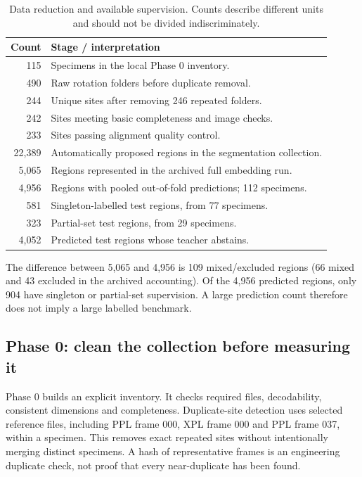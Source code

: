 \begin{table}[htbp]\centering
\caption{Data reduction and available supervision. Counts describe different units and should not be divided indiscriminately.}
\begin{tabularx}{\linewidth}{@{}rX@{}}\toprule Count & Stage / interpretation\\\midrule
115 & Specimens in the local Phase 0 inventory.\\
490 & Raw rotation folders before duplicate removal.\\
244 & Unique sites after removing 246 repeated folders.\\
242 & Sites meeting basic completeness and image checks.\\
233 & Sites passing alignment quality control.\\
22,389 & Automatically proposed regions in the segmentation collection.\\
5,065 & Regions represented in the archived full embedding run.\\
4,956 & Regions with pooled out-of-fold predictions; 112 specimens.\\
581 & Singleton-labelled test regions, from 77 specimens.\\
323 & Partial-set test regions, from 29 specimens.\\
4,052 & Predicted test regions whose teacher abstains.\\\bottomrule
\end{tabularx}
\end{table}
The difference between 5,065 and 4,956 is 109 mixed/excluded regions (66 mixed and 43 excluded in the archived accounting). Of the 4,956 predicted regions, only 904 have singleton or partial-set supervision. A large prediction count therefore does not imply a large labelled benchmark.

\subsection{Phase 0: clean the collection before measuring it}
Phase 0 builds an explicit inventory. It checks required files, decodability, consistent dimensions and completeness. Duplicate-site detection uses selected reference files, including PPL frame 000, XPL frame 000 and PPL frame 037, within a specimen. This removes exact repeated sites without intentionally merging distinct specimens. A hash of representative frames is an engineering duplicate check, not proof that every near-duplicate has been found.

